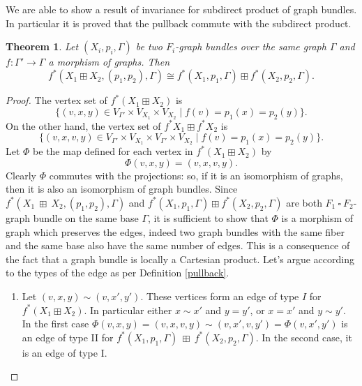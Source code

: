 \documentclass{amsart}
\newtheorem{thm}[theo]{Theorem}
\theoremstyle{definition}
\numberwithin{equation}{section}
\begin{document}
We are able to show a result of invariance for subdirect product of graph bundles. In particular it is proved that the pullback commute with the subdirect product.

\begin{thm}\label{sumstab}
Let $(X_i, p_i, \Gamma)$ be two $F_i$-graph bundles over the same graph $\Gamma$ and  $f: \Gamma' \longrightarrow \Gamma$  a morphism of graphs. Then
\begin{equation}
f^*(X_1 \boxplus X_2, (p_1,p_2), \Gamma) \cong f^*(X_1, p_1, \Gamma) \boxplus f^*(X_2, p_2, \Gamma).
\end{equation}
\end{thm}
\begin{proof}
The vertex set of $f^*(X_1 \boxplus X_2)$ is
\begin{equation}
\{(v,x, y) \in V_{\Gamma'}\times V_{X_1} \times V_{X_2} \mid f(v)= p_1(x)= p_2(y)\}.    
\end{equation}
On the other hand, the vertex set of $f^*X_1 \boxplus f^*X_2$ is
\begin{equation}
\{(v,x, v, y) \in V_{\Gamma'} \times V_{X_1} \times V_{\Gamma'} \times V_{X_2} \mid f(v)= p_1(x)= p_2(y)\}.    
\end{equation}
Let $\Phi$ be the map defined for each vertex in $f^*(X_1 \boxplus X_2)$ by \begin{equation}\Phi(v,x, y) = (v,x, v, y).\end{equation} Clearly $\Phi$ commutes with the projections: so, if it is an isomorphism of graphs, then it is also an isomorphism of graph bundles. Since $f^*(X_1  \ \boxplus \  X_2, (p_1,p_2), \Gamma)$ and $f^*(X_1, p_1, \Gamma) \boxplus f^*(X_2, p_2, \Gamma)$ are both $F_1  \ \square  \ F_2$-graph bundle on the same base $\Gamma$, it is sufficient to show that $\Phi$ is a morphism of graph which preserves the edges, indeed two graph bundles with the same fiber and the same base also have the same number of edges. This is a consequence of the fact that a graph bundle is locally a Cartesian product. Let's argue according to the types of the edge as per Definition \ref{pullback}.

\begin{enumerate}
    \item[(1).] 
Let $(v,x, y)\sim(v,x',y')$. These vertices form an edge of type $I$ for $f^*(X_1 \boxplus X_2)$. In particular either $x \sim x'$ and $y=y'$, or $x = x'$ and $y \sim y'$. In the first case $\Phi(v,x, y) = (v,x, v, y)\sim(v,x',v, y')= \Phi(v,x', y')$ is an edge of type II for $f^*(X_1, p_1, \Gamma)  \ \boxplus \ f^*(X_2, p_2, \Gamma)$. In the second case, it is an edge of type I.



\end{enumerate}
\end{proof}
\end{document}
